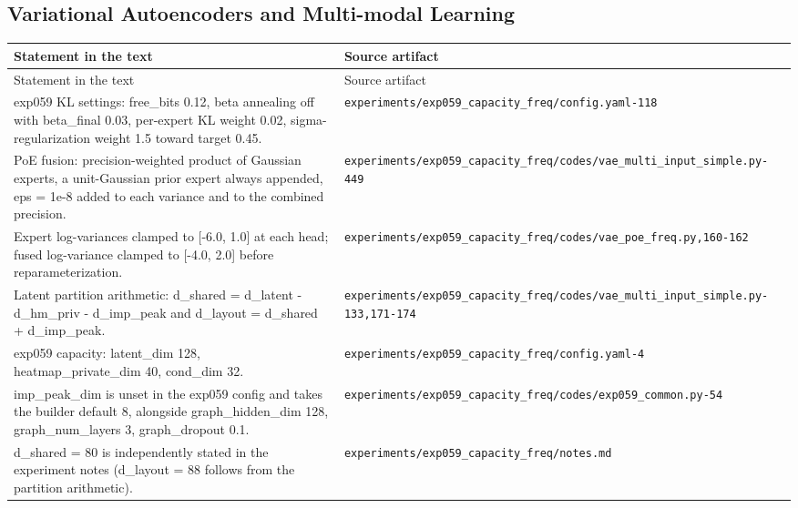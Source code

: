 \subsection*{Variational Autoencoders and Multi-modal Learning}
\begingroup\small
\begin{longtable}{p{} p{}}
\hline
Statement in the text & Source artifact \\
\hline
\endfirsthead
\hline
Statement in the text & Source artifact \\
\hline
\endhead
exp059 KL settings: free\_bits 0.12, beta annealing off with beta\_final 0.03, per-expert KL weight 0.02, sigma-regularization weight 1.5 toward target 0.45. & \texttt{experiments/\allowbreak{}exp059\_\allowbreak{}capacity\_\allowbreak{}freq/\allowbreak{}config.yaml-118} \\
PoE fusion: precision-weighted product of Gaussian experts, a unit-Gaussian prior expert always appended, eps = 1e-8 added to each variance and to the combined precision. & \texttt{experiments/\allowbreak{}exp059\_\allowbreak{}capacity\_\allowbreak{}freq/\allowbreak{}codes/\allowbreak{}vae\_\allowbreak{}multi\_\allowbreak{}input\_\allowbreak{}simple.py-449} \\
Expert log-variances clamped to [-6.0, 1.0] at each head; fused log-variance clamped to [-4.0, 2.0] before reparameterization. & \texttt{experiments/\allowbreak{}exp059\_\allowbreak{}capacity\_\allowbreak{}freq/\allowbreak{}codes/\allowbreak{}vae\_\allowbreak{}poe\_\allowbreak{}freq.py,160-162} \\
Latent partition arithmetic: d\_shared = d\_latent - d\_hm\_priv - d\_imp\_peak and d\_layout = d\_shared + d\_imp\_peak. & \texttt{experiments/\allowbreak{}exp059\_\allowbreak{}capacity\_\allowbreak{}freq/\allowbreak{}codes/\allowbreak{}vae\_\allowbreak{}multi\_\allowbreak{}input\_\allowbreak{}simple.py-133,171-174} \\
exp059 capacity: latent\_dim 128, heatmap\_private\_dim 40, cond\_dim 32. & \texttt{experiments/\allowbreak{}exp059\_\allowbreak{}capacity\_\allowbreak{}freq/\allowbreak{}config.yaml-4} \\
imp\_peak\_dim is unset in the exp059 config and takes the builder default 8, alongside graph\_hidden\_dim 128, graph\_num\_layers 3, graph\_dropout 0.1. & \texttt{experiments/\allowbreak{}exp059\_\allowbreak{}capacity\_\allowbreak{}freq/\allowbreak{}codes/\allowbreak{}exp059\_\allowbreak{}common.py-54} \\
d\_shared = 80 is independently stated in the experiment notes (d\_layout = 88 follows from the partition arithmetic). & \texttt{experiments/\allowbreak{}exp059\_\allowbreak{}capacity\_\allowbreak{}freq/\allowbreak{}notes.md} \\

\end{longtable}
